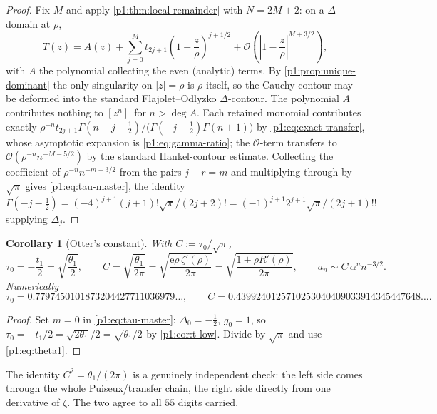 \documentclass[11pt,a4paper,oneside]{book}
\theoremstyle{plain}
\newtheorem{corollary}[theorem]{Corollary}
\theoremstyle{definition}
\theoremstyle{remark}
\newcommand{\e}{\mathrm{e}}
\newcommand{\Coef}[1]{[#1]\,}
\newcommand{\bigO}{\mathcal{O}}
\begin{document}
\begin{proof}
Fix $M$ and apply \cref{p1:thm:local-remainder} with $N=2M+2$: on a $\Delta$-domain at $\rho$,
\[
T(z)=A(z)+\sum_{j=0}^{M}t_{2j+1}\left(1-\frac z\rho\right)^{j+1/2} +\bigO\!\left(\left|1-\frac
z\rho\right|^{M+3/2}\right),
\]
with $A$ the polynomial collecting the even (analytic) terms.  By
\cref{p1:prop:unique-dominant} the only singularity on $|z|=\rho$ is $\rho$ itself, so the
Cauchy contour may be deformed into the standard Flajolet--Odlyzko $\Delta$-contour.  The
polynomial $A$ contributes nothing to $\Coef{z^n}$ for $n>\deg A$.  Each retained monomial
contributes exactly $\rho^{-n}t_{2j+1}\Gamma(n-j-\tfrac12)/
\bigl(\Gamma(-j-\tfrac12)\Gamma(n+1)\bigr)$ by \cref{p1:eq:exact-transfer}, whose asymptotic
expansion is \cref{p1:eq:gamma-ratio}; the $\bigO$-term transfers to
$\bigO(\rho^{-n}n^{-M-5/2})$ by the standard Hankel-contour estimate. Collecting the
coefficient of $\rho^{-n}n^{-m-3/2}$ from the pairs $j+r=m$ and multiplying through by
$\sqrt\pi$ gives \cref{p1:eq:tau-master}, the identity
$\Gamma(-j-\tfrac12)=(-4)^{j+1}(j+1)!\sqrt\pi/(2j+2)! =(-1)^{j+1}2^{j+1}\sqrt\pi/(2j+1)!!$
supplying $\Delta_j$.
\end{proof}

\begin{corollary}[Otter's constant]
\label{p1:cor:otter}
With $C:=\tau_0/\sqrt\pi$,
\begin{equation}
 \tau_0=-\frac{t_1}{2}=\sqrt{\frac{\theta_1}{2}},
 \qquad
 C=\sqrt{\frac{\theta_1}{2\pi}}=\sqrt{\frac{\e\rho\,\zeta'(\rho)}{2\pi}}
 =\sqrt{\frac{1+\rho R'(\rho)}{2\pi}},
 \qquad
 a_n\sim C\,\alpha^{n}n^{-3/2}.
 \label{p1:eq:otter}
\end{equation}
Numerically
\begin{equation}
 \tau_0=0.7797450101873204427711036979\ldots,\qquad
 C=0.4399240125710253040409033914345447648\ldots .
 \label{p1:eq:C-numeric}
\end{equation}
\end{corollary}

\begin{proof}
Set $m=0$ in \cref{p1:eq:tau-master}: $\Delta_0=-\tfrac12$, $g_0=1$, so
$\tau_0=-t_1/2=\sqrt{2\theta_1}/2=\sqrt{\theta_1/2}$ by \cref{p1:cor:t-low}. Divide by
$\sqrt\pi$ and use \cref{p1:eq:theta1}.
\end{proof}

The identity $C^{2}=\theta_1/(2\pi)$ is a genuinely independent check: the left side comes
through the whole Puiseux/transfer chain, the right side directly from one derivative of
$\zeta$.  The two agree to all $55$ digits carried.
\end{document}
